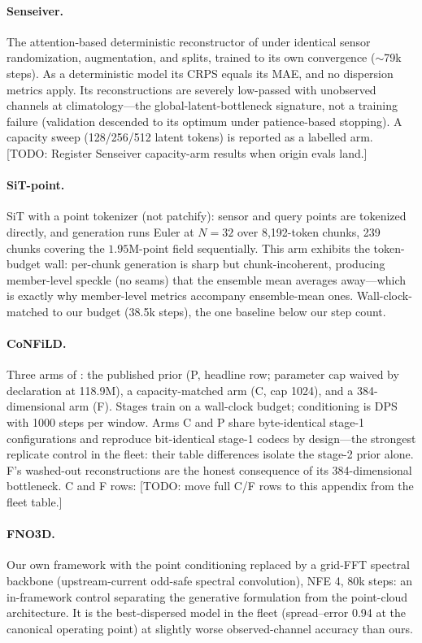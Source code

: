 \documentclass{article} %
\newcommand{\todo}[1]{{\color{red}[TODO: #1]}}
\begin{document}
\paragraph{Senseiver.} The attention-based deterministic reconstructor of \citet{santos2023senseiver} under identical sensor randomization, augmentation, and splits, trained to its own convergence ($\sim$79k steps). As a deterministic model its CRPS equals its MAE, and no dispersion metrics apply. Its reconstructions are severely low-passed with unobserved channels at climatology---the global-latent-bottleneck signature, not a training failure (validation descended to its optimum under patience-based stopping). A capacity sweep (128/256/512 latent tokens) is reported as a labelled arm. \todo{Register Senseiver capacity-arm results when origin evals land.}

\paragraph{SiT-point.} SiT \citep{ma2024sit} with a point tokenizer (not patchify): sensor and query points are tokenized directly, and generation runs Euler at $N{=}32$ over 8{,}192-token chunks, 239 chunks covering the $1.95$M-point field sequentially. This arm exhibits the token-budget wall: per-chunk generation is sharp but chunk-incoherent, producing member-level speckle (no seams) that the ensemble mean averages away---which is exactly why member-level metrics accompany ensemble-mean ones. Wall-clock-matched to our budget (38.5k steps), the one baseline below our step count.

\paragraph{CoNFiLD.} Three arms of \citet{du2024confild}: the published prior (P, headline row; parameter cap waived by declaration at 118.9M), a capacity-matched arm (C, cap 1024), and a 384-dimensional arm (F). Stages train on a wall-clock budget; conditioning is DPS with 1000 steps per window. Arms C and P share byte-identical stage-1 configurations and reproduce bit-identical stage-1 codecs by design---the strongest replicate control in the fleet: their table differences isolate the stage-2 prior alone. F's washed-out reconstructions are the honest consequence of its 384-dimensional bottleneck. C and F rows: \todo{move full C/F rows to this appendix from the fleet table.}

\paragraph{FNO3D.} Our own framework with the point conditioning replaced by a grid-FFT spectral backbone (upstream-current odd-safe spectral convolution), NFE 4, 80k steps: an in-framework control separating the generative formulation from the point-cloud architecture. It is the best-dispersed model in the fleet (spread--error 0.94 at the canonical operating point) at slightly worse observed-channel accuracy than ours.
\end{document}
